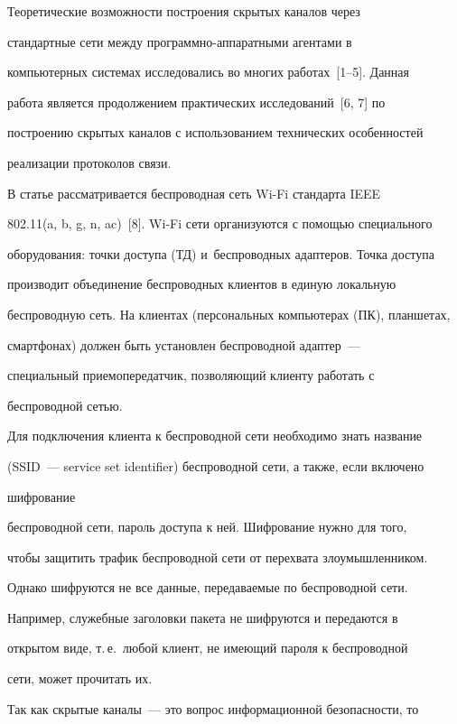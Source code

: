   Теоретические возможности построения скрытых каналов через


стандартные сети между программно-аппаратными агентами в


компьютерных системах исследовались во многих работах~[1--5]. Данная


работа является продолжением практических исследований~[6, 7] по


построению скрытых каналов с использованием технических особенностей


реализации протоколов связи.





  В статье рассматривается беспроводная сеть Wi-Fi стандарта IEEE


802.11(a, b, g, n, ac)~[8]. Wi-Fi сети организуются с помощью специального


оборудования: точки доступа (ТД) и~беспроводных адаптеров. Точка доступа


производит объединение беспроводных клиентов в единую локальную


беспроводную сеть. На клиентах (персональных компьютерах (ПК), планшетах,


смартфонах) должен быть установлен беспроводной адаптер~---


специальный приемопередатчик, поз\-во\-ля\-ющий клиенту работать с


беспроводной сетью.





  Для подключения клиента к беспроводной сети необходимо знать название


(SSID~--- service set identifier) беспроводной сети, а также, если включено


шиф\-ро\-ва\-ние


беспроводной сети, пароль доступа к ней. Шифрование нужно для того,


чтобы защитить трафик беспроводной сети от перехвата злоумышленником.


Однако шифруются не все данные, передаваемые по беспроводной сети.


Например, служебные заголовки пакета не шифруются и передаются в


открытом виде, т.\,е.\ любой клиент, не имеющий пароля к беспроводной


сети, может прочитать их.





  Так как скрытые каналы~--- это вопрос информационной безопасности, то


